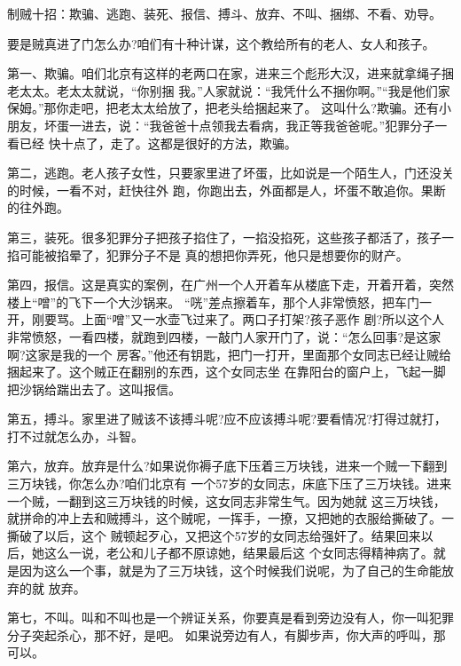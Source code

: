 \documentclass[11pt,a4paper,onecolumn]{article}
\begin{document}
制贼十招：欺骗、逃跑、装死、报信、搏斗、放弃、不叫、捆绑、不看、劝导。

要是贼真进了门怎么办?咱们有十种计谋，这个教给所有的老人、女人和孩子。

第一、欺骗。咱们北京有这样的老两口在家，进来三个彪形大汉，进来就拿绳子捆老太太。老太太就说，``你别捆
我。''人家就说：``我凭什么不捆你啊。''``我是他们家保姆。''那你走吧，把老太太给放了，把老头给捆起来了。
这叫什么?欺骗。还有小朋友，坏蛋一进去，说：``我爸爸十点领我去看病，我正等我爸爸呢。''犯罪分子一看已经
快十点了，走了。这都是很好的方法，欺骗。

第二，逃跑。老人孩子女性，只要家里进了坏蛋，比如说是一个陌生人，门还没关的时候，一看不对，赶快往外
跑，你跑出去，外面都是人，坏蛋不敢追你。果断的往外跑。

第三，装死。很多犯罪分子把孩子掐住了，一掐没掐死，这些孩子都活了，孩子一掐可能被掐晕了，犯罪分子不是
真的想把你弄死，他只是想要你的财产。

第四，报信。这是真实的案例，在广州一个人开着车从楼底下走，开着开着，突然楼上``噌''的飞下一个大沙锅来。
``咣''差点擦着车，那个人非常愤怒，把车门一开，刚要骂。上面``噌''又一水壶飞过来了。两口子打架?孩子恶作
剧?所以这个人非常愤怒，一看四楼，就跑到四楼，一敲门人家开门了，说：``怎么回事?是这家啊?这家是我的一个
房客。''他还有钥匙，把门一打开，里面那个女同志已经让贼给捆起来了。这个贼正在翻别的东西，这个女同志坐
在靠阳台的窗户上，飞起一脚把沙锅给踹出去了。这叫报信。

第五，搏斗。家里进了贼该不该搏斗呢?应不应该搏斗呢?要看情况?打得过就打，打不过就怎么办，斗智。

第六，放弃。放弃是什么?如果说你褥子底下压着三万块钱，进来一个贼一下翻到三万块钱，你怎么办?咱们北京有
一个57岁的女同志，床底下压了三万块钱。进来一个贼，一翻到这三万块钱的时候，这女同志非常生气。因为她就
这三万块钱，就拼命的冲上去和贼搏斗，这个贼呢，一挥手，一撩，又把她的衣服给撕破了。一撕破了以后，这个
贼顿起歹心，又把这个57岁的女同志给强奸了。结果回来以后，她这么一说，老公和儿子都不原谅她，结果最后这
个女同志得精神病了。就是因为这么一个事，就是为了三万块钱，这个时候我们说呢，为了自己的生命能放弃的就
放弃。

第七，不叫。叫和不叫也是一个辨证关系，你要真是看到旁边没有人，你一叫犯罪分子突起杀心，那不好，是吧。
如果说旁边有人，有脚步声，你大声的呼叫，那可以。
\end{document}
